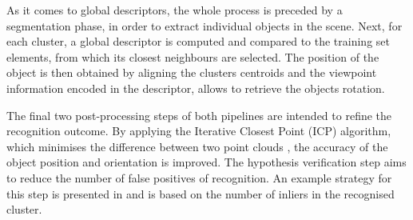 As it comes to global descriptors, the whole process is preceded by a segmentation phase, in order to extract individual objects in the scene. Next, for each cluster, a global descriptor is computed and compared to the training set elements, from which its closest neighbours are selected. The position of the object is then obtained by aligning the clusters centroids and the viewpoint information encoded in the descriptor, allows to retrieve the objects rotation.

The final two post-processing steps of both pipelines are intended to refine the recognition outcome. By applying the Iterative Closest Point (ICP) algorithm, which minimises the difference between two point clouds \cite{wikipedia}, the accuracy of the object position and orientation is improved. The hypothesis verification step aims to reduce the number of false positives of recognition. An example strategy for this step is presented in \cite{hipoveri} and is based on the number of inliers in the recognised cluster. 